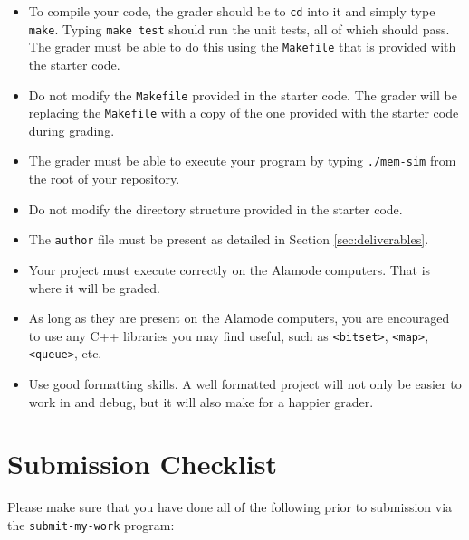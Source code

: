 \documentclass[10pt]{article}
\begin{document}
\begin{itemize}
    \item To compile your code, the grader should be to \texttt{cd} into it and simply type \texttt{make}. Typing \texttt{make test} should run the unit tests, all of which should pass. The grader must be able to do this using the \texttt{Makefile} that is provided with the starter code.
    \item Do not modify the \texttt{Makefile} provided in the starter code. The grader will be replacing the \texttt{Makefile} with a copy of the one provided with the starter code during grading.
    \item The grader must be able to execute your program by typing \texttt{./mem-sim} from the root of your repository.
    \item Do not modify the directory structure provided in the starter code.
    \item The \texttt{author} file must be present as detailed in Section \ref{sec:deliverables}.
    \item Your project must execute correctly on the Alamode computers. That is where it will be graded.
    \item As long as they are present on the Alamode computers, you are encouraged to use any C++ libraries you may find useful, such as \texttt{<bitset>}, \texttt{<map>}, \texttt{<queue>}, etc.
    \item Use good formatting skills. A well formatted project will not only be easier to work in and debug, but it will also make for a happier grader.
\end{itemize}

\section{Submission Checklist}

Please make sure that you have done all of the following prior to submission via the \texttt{submit-my-work} program:
\end{document}
